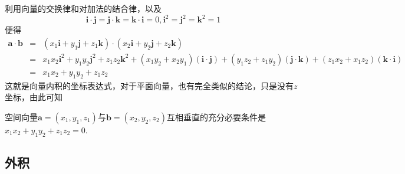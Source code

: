 利用向量的交换律和对加法的结合律，以及
\[ \bm{i} \cdot \bm{j} = \bm{j} \cdot \bm{k} = \bm{k} \cdot \bm{i} = 0, \bm{i}^2 = \bm{j}^2 = \bm{k}^2=1 \]
便得
\begin{eqnarray*}
  \bm{a} \cdot \bm{b} & = & (x_1 \bm{i} + y_1 \bm{j} + z_1 \bm{k}) \cdot (x_2 \bm{i} + y_2 \bm{j} + z_2 \bm{k}) \\
                      & = & x_1x_2 \bm{i}^2 + y_1y_2 \bm{j}^2 + z_1z_2 \bm{k}^2 + (x_1y_2+x_2y_1)(\bm{i} \cdot \bm{j}) + (y_1z_2+z_1y_2)(\bm{j} \cdot \bm{k}) + (z_1x_2 + x_1z_2)(\bm{k} \cdot \bm{i}) \\
  & = & x_1x_2 + y_1y_2+z_1z_2
\end{eqnarray*}
这就是向量内积的坐标表达式，对于平面向量，也有完全类似的结论，只是没有$z$坐标，由此可知

\begin{theorem}
  空间向量$\bm{a}=(x_1,y_1,z_1)$与$\bm{b} = (x_2,y_2,z_2)$互相垂直的充分必要条件是$x_1x_2+y_1y_2+z_1z_2=0$.
\end{theorem}


\subsection{外积}
\label{sec:outer-product-of-vectors}



